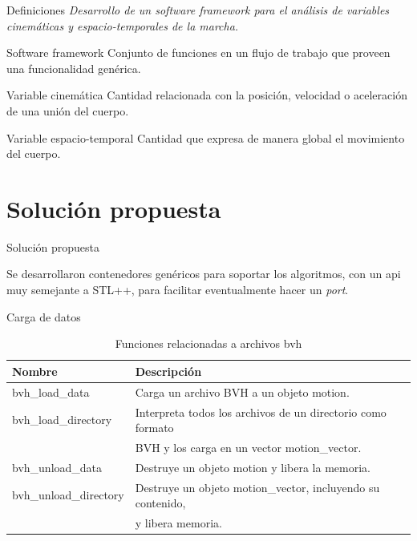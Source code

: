 \documentclass{beamer} %
\newcommand{\mono}[1]{{\ttfamily #1}}
\begin{document}
\begin{frame}{Definiciones}
    \emph{Desarrollo de un software framework para el análisis de variables cinemáticas y espacio-temporales de la marcha.} \\
    \begin{block}{Software framework}
        Conjunto de funciones en un flujo de trabajo que proveen una funcionalidad genérica. 
    \end{block}
    \begin{block}{Variable cinemática}
        Cantidad relacionada con la posición, velocidad o aceleración de una unión del cuerpo.
    \end{block}
    \begin{block}{Variable espacio-temporal}
        Cantidad que expresa de manera global el movimiento del cuerpo.
    \end{block}
\end{frame}

\section{Solución propuesta}

\begin{frame}{Solución propuesta}
    \begin{block}{}
        Se desarrollaron contenedores genéricos para soportar los algoritmos, con un api muy semejante a STL++, para facilitar eventualmente hacer un \emph{port}.
    \end{block}
\end{frame}

\begin{frame}{Carga de datos}
\begin{table}
    \centering
    \caption{Funciones relacionadas a archivos bvh}
    \label{tab:bvh}
    \scriptsize 
    \begin{tabular}{ll}
        \toprule
        Nombre & Descripción \\
        \midrule
        \mono{bvh\_load\_data} & Carga un archivo BVH a un objeto \mono{motion}. \\
        \mono{bvh\_load\_directory} & Interpreta todos los archivos de un directorio como formato \\ & BVH y los carga en un vector \mono{motion\_vector}. \\
        \mono{bvh\_unload\_data} & Destruye un objeto \mono{motion} y libera la memoria. \\
        \mono{bvh\_unload\_directory} & Destruye un objeto \mono{motion\_vector}, incluyendo su contenido, \\ & y libera memoria. \\
        \bottomrule
    \end{tabular}
\end{table}
\end{frame}
\end{document}

